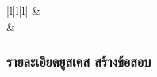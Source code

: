 \begin{table}[H]
\begin{tabular}{|l|l|l|}
  \hline
                       & \\[-\rowheight]
  \printcelltop                                     & \\
  \hline
  \end{tabular}
  \caption{รายละเอียดยูสเคส คัดลอกหมวดหมู่ข้อสอบสาธารณะ}
  \label{Table:copyPublicCategory}
\end{table}

\subsubsection{รายละเอียดยูสเคส สร้างข้อสอบ}

